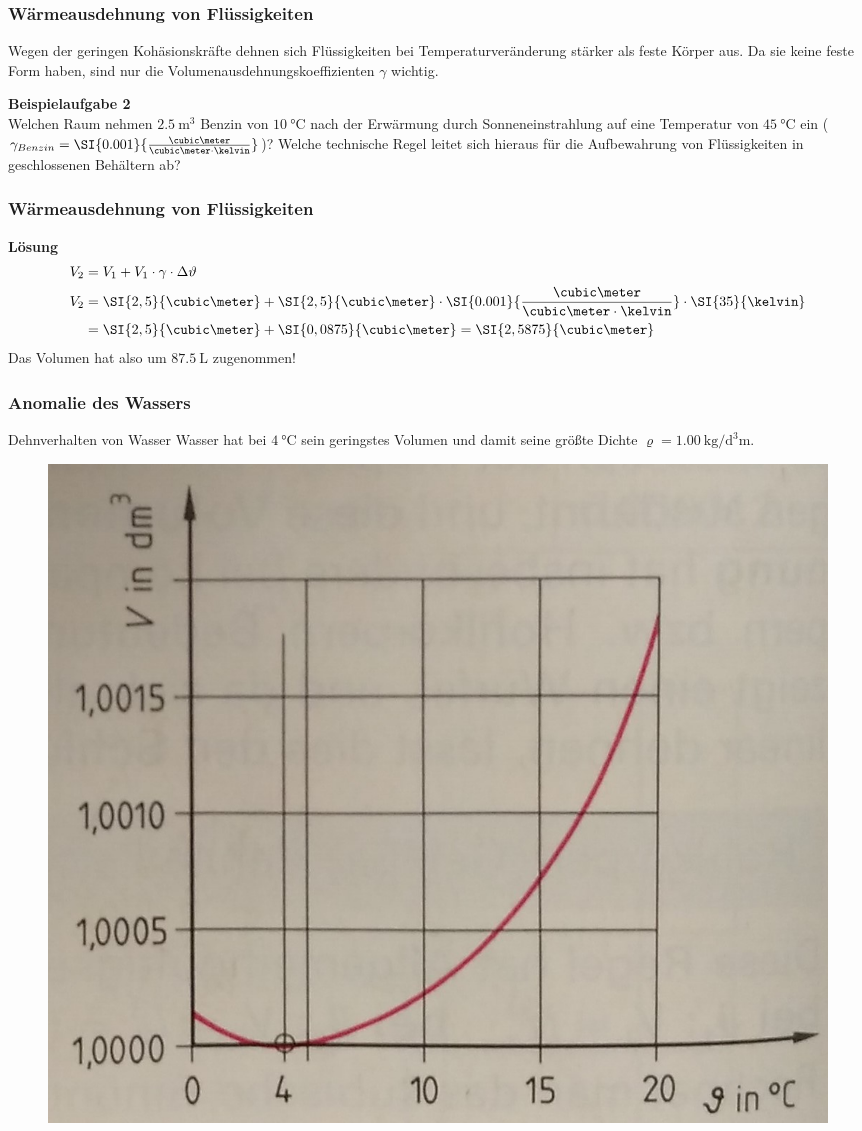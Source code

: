 \documentclass{beamer}
\begin{document}
\frame
{
  \frametitle{Wärmeausdehnung von Flüssigkeiten}
  \begin{block}{}
  Wegen der geringen Kohäsionskräfte dehnen sich Flüssigkeiten bei Temperaturveränderung stärker als feste Körper aus. Da sie keine feste Form haben, sind nur die Volumenausdehnungskoeffizienten $\gamma$ wichtig.
  \end{block}
\textbf{Beispielaufgabe 2}\\
Welchen Raum nehmen $\SI{2,5}{\cubic\meter}$ Benzin von $\SI{10}{\celsius}$ nach der Erwärmung durch Sonneneinstrahlung auf eine Temperatur von $\SI{45}{\celsius}$ ein ($\gamma_{Benzin}=\SI{0.001}{\frac{\cubic\meter}{\cubic\meter\cdot\kelvin}}$)? Welche technische Regel leitet sich hieraus für die Aufbewahrung von Flüssigkeiten in geschlossenen Behältern ab?
}

\frame
{
\frametitle{Wärmeausdehnung von Flüssigkeiten}
\textbf{Lösung}\\
\begin{align*}
V_2&=V_1+ V_1\cdot\gamma\cdot\Delta\vartheta\\
V_2&=\SI{2,5}{\cubic\meter}+\SI{2,5}{\cubic\meter}\cdot\SI{0.001}{\frac{\cubic\meter}{\cubic\meter\cdot\kelvin}}\cdot\SI{35}{\kelvin}\\
&=\SI{2,5}{\cubic\meter}+\SI{0,0875}{\cubic\meter}=\SI{2,5875}{\cubic\meter}
\end{align*}
Das Volumen hat also um $\SI{87,5}{\liter}$ zugenommen!
}

\frame
{
\frametitle{Anomalie des Wassers}
	\begin{block}{Dehnverhalten von Wasser}
	Wasser hat bei $\SI{4}{\celsius}$ sein geringstes Volumen und damit seine größte Dichte $\varrho=\SI{1.00}{\kilo\gram\per\cubic\deci\meter}$.
	\end{block}
\begin{figure}
	\includegraphics[width=0.5\linewidth]{Anomalie.jpg}
\end{figure}
}
\end{document}
